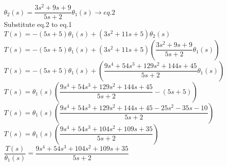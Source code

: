 \documentclass[11pt,letterpaper]{article}
\begin{document}
        $\theta_2(s)=\dfrac{3s^2+9s+9}{5s+2}\theta_1(s)  \rightarrow eq.2$\\

        Substitute eq.2 to eq.1\\

        $T(s)=-(5s+5)\theta_1(s)+(3s^2+11s+5)\theta_2(s)$\\

        $T(s)=-(5s+5)\theta_1(s)+(3s^2+11s+5)\left(\dfrac{3s^2+9s+9}{5s+2}\theta_1(s)\right)$\\

        $T(s)=-(5s+5)\theta_1(s)+\left(\dfrac{9s^4+54s^3+129s^2+144s+45}{5s+2}\theta_1(s)\right)$\\

        $T(s)=\theta_1(s)\left(\dfrac{9s^4+54s^3+129s^2+144s+45}{5s+2}-(5s+5)\right)$\\

        $T(s)=\theta_1(s)\left(\dfrac{9s^4+54s^3+129s^2+144s+45-25s^2-35s-10}{5s+2}\right)$\\

        $T(s)=\theta_1(s)\left(\dfrac{9s^4+54s^3+104s^2+109s+35}{5s+2}\right)$\\

        $\dfrac{T(s)}{\theta_1(s)}=\dfrac{9s^4+54s^3+104s^2+109s+35}{5s+2}$\\

        \\	
			
\clearpage
\end{document}
